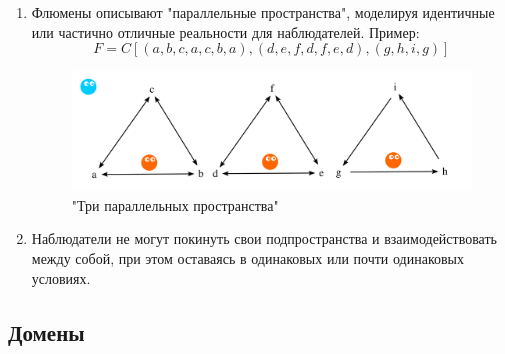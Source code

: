 \documentclass[final]{article}
\begin{document}
            \begin{enumerate}

                \item Флюмены описывают "параллельные пространства", моделируя 
                идентичные или частично отличные реальности для наблюдателей. Пример: \[ 
                F = C[(a,b,c,a,c,b,a), (d,e,f,d,f,e,d), (g,h,i,g)] \]

                \begin{figure}[H]
                    \centering
                    \includegraphics[width=\textwidth]{./parallel.png}
                    \caption{"Три параллельных пространства"}
                    \label{fig:image}
                \end{figure}

                \item Наблюдатели не могут покинуть свои подпространства и 
                взаимодействовать между собой, при этом оставаясь в одинаковых или почти 
                одинаковых условиях.

            \end{enumerate}



        \subsection{Домены}
\end{document}
